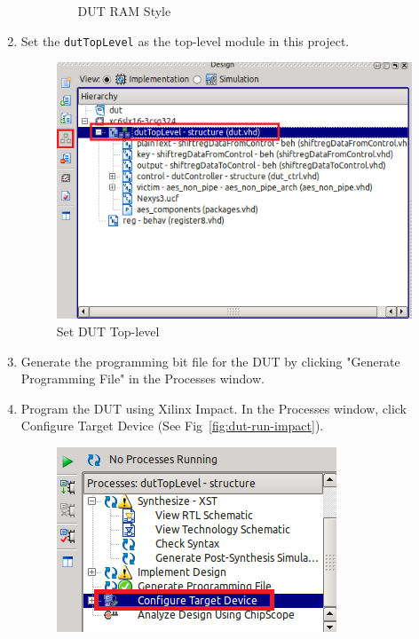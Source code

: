 \begin{enumerate}
\begin{enumerate}
\begin{figure}[H]
\begin{center}
		\caption{\label{fig:dut-ram-style}DUT RAM Style}
		\end{center}
		\vspace{-3ex}
		\end{figure}
     \end{enumerate}
  \item Set the \texttt{dutTopLevel} as the top-level module in this project.
		\begin{figure}[H]
		\begin{center}
		\includegraphics[scale=0.6]{figures/dut-set-top-level}
		\caption{\label{fig:dut-set-top-level}Set DUT Top-level}
		\end{center}
		\vspace{-3ex}
		\end{figure}
  \item Generate the programming bit file for the DUT by clicking "Generate Programming File" in the Processes window.
  \item Program the DUT using Xilinx Impact. In the Processes window, click Configure Target Device (See Fig~\ref{fig:dut-run-impact}).
		\begin{figure}[H]
		\begin{center}
		\includegraphics[scale=0.6]{figures/dut-run-impact}

\end{center}
\end{figure}
\end{enumerate}

